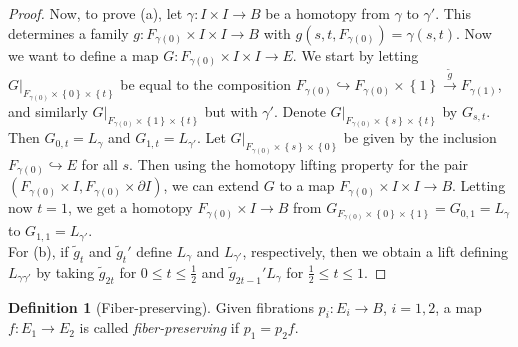\documentclass[reqno]{amsart}
\theoremstyle{definition}
\newtheorem{definition}[theorem]{Definition}
\theoremstyle{remark}
\begin{document}
\begin{proof}
         Now, to prove (a), let
         $\gamma \colon I \times I \to 
         B$ be a homotopy from
         $\gamma$ to $\gamma'$. This determines
         a family
         $g \colon F_{\gamma(0)} \times I \times I
         \to B$ with $g\left( s,t, F_{\gamma(0)} \right) 
         = \gamma(s,t)$. 
         Now we want to define a map
         $G \colon F_{\gamma(0)}\times I \times I \to 
         E$. We start by
         letting
         $G|_{F_{\gamma(0)} \times \left\{ 0 \right\} 
         \times \left\{ t \right\} }$ be
         equal to the composition
         $F_{\gamma(0)}\hookrightarrow 
         F_{\gamma(0)}\times \left\{ 1 \right\} 
         \stackrel{\tilde{g}}{\to} F_{\gamma(1)}$, and
         similarly
         $G|_{F_{\gamma(0)}\times \left\{ 1 \right\} 
         \times \left\{ t \right\} }$ but with $\gamma'$.
         Denote 
         $G|_{F_{\gamma(0)} \times 
         \left\{ s \right\} \times \left\{ t \right\} }$ 
         by $G_{s,t}$. Then
         $G_{0,t} = L_{\gamma}$ and
         $G_{1,t} = L_{\gamma'}$.
         Let
         $G|_{F_{\gamma(0)}\times 
         \left\{ s \right\} \times \left\{ 0 \right\} }$ 
         be given by the inclusion
         $F_{\gamma(0)} \hookrightarrow E$ for all
         $s$. Then using the homotopy
         lifting property for the pair
         $\left( F_{\gamma(0) } \times I,
         F_{\gamma(0)} \times \partial I\right) $, we
         can extend $G$ to a map
         $F_{\gamma(0)} \times I \times I \to B$.
         Letting now $t = 1$, we
         get a homotopy
         $F_{\gamma(0)} \times I \to B$ 
         from
         $G_{F_{\gamma(0)} \times \left\{ 0 \right\} 
         \times \left\{ 1 \right\} }
         = G_{0,1} = L_{\gamma}$ to
         $G_{1,1} = L_{\gamma'}$.\\
         For (b), if
         $\tilde{g}_t$ and
         $\tilde{g}_t'$ define $L_{\gamma}$ and
         $L_{\gamma'}$, respectively, then
         we obtain a lift defining
         $L_{\gamma \gamma'}$ by taking
         $\tilde{g}_{2t}$ for 
         $0 \le t \le \frac{1}{2}$ and
         $\tilde{g}_{2t-1}' L_{\gamma}$ for
         $\frac{1}{2} \le t \le 1$.








     \end{proof}

     \begin{definition}[Fiber-preserving]
         Given fibrations
         $p_i \colon E_i \to B$, $i=1,2$, a map
         $f \colon E_1 \to E_2$ is called 
         \textit{fiber-preserving} if
         $p_1 = p_2 f$.
     \end{definition}
\end{document}
